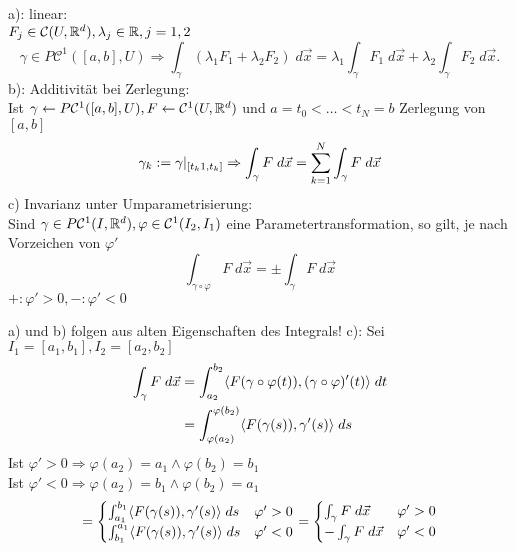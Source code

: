 \documentclass[../ana2.tex]{subfiles}
\begin{document}
\begin{lem}
    a): linear: \\
    \( F_j \in \mathcal{C}(U, \R^d), \lambda_j \in \R, j = 1,2 \)
    \[ \gamma \in P\mathcal{C}^1([a,b], U) \Rightarrow 
    \int_\gamma (\lambda_1 F_1 + \lambda_2 F_2)\; d\vec{x} 
    = \lambda_1 \int_\gamma F_1\; d\vec{x} + \lambda_2 \int_\gamma F_2\; d\vec{x}. \]   
    b): Additivität bei Zerlegung:\\
    Ist \(\gamma \leftarrow P\mathcal{C}^1([a,b], U), F \leftarrow \mathcal{C}^1(U, \R^d) \)
    und \(a = t_0 < \ldots < t_N = b\) Zerlegung von \([a,b]\)
    \[\gamma_k := \gamma\vert_{[t_k1, t_k]}
    \Rightarrow \integralx{F}{\gamma}{}{\vec{x}}
    = \sum_{k=1}^N\integralx{F}{\gamma}{}{\vec{x}}\]    
    c) Invarianz unter Umparametrisierung:\\
    Sind \(\gamma \in P\mathcal{C}^1(I,\R^d), \varphi \in \mathcal{C}^1(I_2, I_1)\)
    eine Parametertransformation, so gilt, je nach Vorzeichen von \(\varphi'\)
    \[ \int_{\gamma \circ \varphi} F \; d\vec{x} = \pm \int_\gamma F \; d\vec{x} \]
    \(+: \varphi' > 0, -: \varphi' < 0\)
\end{lem}
\begin{bew}
    a) und b) folgen aus alten Eigenschaften des Integrals!
    c): Sei \(I_1 = [a_1,b_1], I_2 = [a_2,b_2]\)
    \begin{align*}
        \integralx{F}{\gamma}{}{\vec{x}} 
        &= \integralx{\scalarprod{F(\gamma \circ \varphi(t))}{(\gamma \circ \varphi)'(t)}}{a_2}{b_2}{t} \\
        &= \integralx{ \scalarprod{ F(\gamma(s)) }{ \gamma'(s) } }{\varphi(a_2)}{\varphi(b_2)}{s}
    \end{align*}
    Ist \(\varphi' > 0 \Rightarrow \varphi(a_2) = a_1 \wedge \varphi(b_2) = b_1\)\\
    Ist \(\varphi' < 0 \Rightarrow \varphi(a_2) = b_1 \wedge \varphi(b_2) = a_1\)
    \[ = \begin{cases}
        \integralx{\scalarprod{F(\gamma(s))}{\gamma'(s)}}{a_1}{b_1}{s} & \varphi' > 0 \\
    \integralx{\scalarprod{F(\gamma(s))}{\gamma'(s)}}{b_1}{a_1}{s} & \varphi' < 0 \\
    \end{cases} = \begin{cases}
        \int_\gamma F \; d\vec{x} & \varphi' > 0 \\
        - \int_\gamma F \; d\vec{x} & \varphi' < 0
    \end{cases} \]    
\end{bew}
\end{document}

